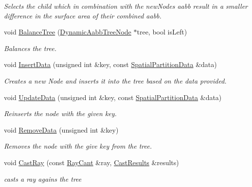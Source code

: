 \begin{DoxyCompactItemize}
\begin{DoxyCompactList}\small\item\em Selects the child which in combination with the new\+Nodes aabb result in a smaller difference in the surface area of their combined aabb. \end{DoxyCompactList}\item 
void \hyperlink{classDynamicAabbTree_a5b1ccfaeccdac45d57316b61eb9a49ac}{Balance\+Tree} (\hyperlink{classDynamicAabbTreeNode}{Dynamic\+Aabb\+Tree\+Node} $\ast$tree, bool is\+Left)
\begin{DoxyCompactList}\small\item\em Balances the tree. \end{DoxyCompactList}\item 
void \hyperlink{classDynamicAabbTree_a1ede16b26b57e97564fb605f65acb4b6}{Insert\+Data} (unsigned int \&key, const \hyperlink{classSpatialPartitionData}{Spatial\+Partition\+Data} \&data)
\begin{DoxyCompactList}\small\item\em Creates a new Node and inserts it into the tree based on the data provided. \end{DoxyCompactList}\item 
void \hyperlink{classDynamicAabbTree_acacce0180628f79c049fde2af0c64a33}{Update\+Data} (unsigned int \&key, const \hyperlink{classSpatialPartitionData}{Spatial\+Partition\+Data} \&data)
\begin{DoxyCompactList}\small\item\em Reinserts the node with the given key. \end{DoxyCompactList}\item 
void \hyperlink{classDynamicAabbTree_a57bb2fa78ba6a3932f125be5e06200db}{Remove\+Data} (unsigned int \&key)
\begin{DoxyCompactList}\small\item\em Removes the node with the give key from the tree. \end{DoxyCompactList}\item 
void \hyperlink{classDynamicAabbTree_a6b696b5d7886bc26ec7ee81a090bbbb9}{Cast\+Ray} (const \hyperlink{classRayCant}{Ray\+Cant} \&ray, \hyperlink{classCastResults}{Cast\+Results} \&results)
\begin{DoxyCompactList}\small\item\em casts a ray agains the tree \end{DoxyCompactList}\item 
\mbox{\label{classDynamicAabbTree_abaf141451bf5b62373a6a8d978bd877f}} 

\end{DoxyCompactItemize}

